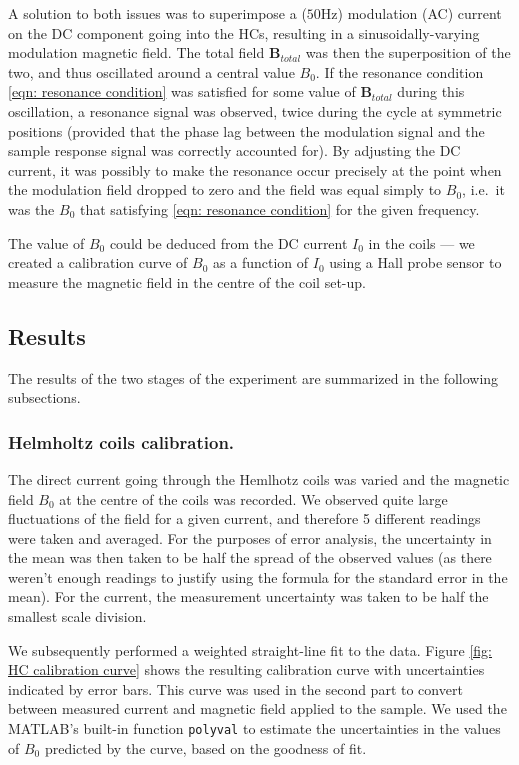 \documentclass[a4paper]{jpconf}
\numberwithin{equation}{section}
\begin{document}
A solution to both issues was to superimpose a ($50 \si{\hertz}$) modulation (AC) current on the DC component going into the HCs, resulting in a sinusoidally-varying modulation magnetic field. The total field $\mathbf{B}_{total}$ was then the superposition of the two, and thus oscillated around a central value $B_0$. If the resonance condition \eqref{eqn: resonance condition} was satisfied for some value of $\mathbf{B}_{total}$ during this oscillation, a resonance signal was observed, twice during the cycle at symmetric positions (provided that the phase lag between the modulation signal and the sample response signal was correctly accounted for). By adjusting the DC current, it was possibly to make the resonance occur precisely at the point when the modulation field dropped to zero and the field was equal simply to $B_0$, i.e.\ it was the $B_0$ that satisfying \eqref{eqn: resonance condition} for the given frequency.

The value of $B_0$ could be deduced from the DC current $I_0$ in the coils --- we created a calibration curve of $B_0$ as a function of $I_0$ using a Hall probe sensor to measure the magnetic field in the centre of the coil set-up.

\subsection{Results}
The results of the two stages of the experiment are summarized in the following subsections.

\subsubsection{Helmholtz coils calibration.} \label{section: calibration}
The direct current going through the Hemlhotz coils was varied and the magnetic field $B_0$ at the centre of the coils was recorded. We observed quite large fluctuations of the field for a given current, and therefore 5 different readings were taken and averaged. For the purposes of error analysis, the uncertainty in the mean was then taken to be half the spread of the observed values (as there weren't enough readings to justify using the formula for the standard error in the mean). For the current, the measurement uncertainty was taken to be half the smallest scale division. 

We subsequently performed a weighted straight-line fit to the data. Figure \ref{fig: HC calibration curve} shows the resulting calibration curve with uncertainties indicated by error bars. This curve was used in the second part to convert between measured current and magnetic field applied to the sample. We used the MATLAB's built-in function \texttt{polyval} to estimate the uncertainties in the values of $B_0$ predicted by the curve, based on the goodness of fit.
\end{document}
